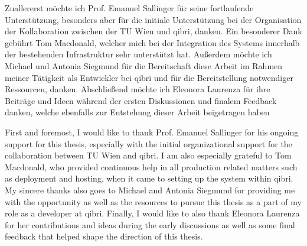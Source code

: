 \documentclass[draft,final]{vutinfth} %
\begin{document}
\frontmatter %

\addstatementpage

\begin{danksagung*}
Zuallererst möchte ich Prof. Emanuel Sallinger für seine fortlaufende Unterstützung, besonders aber für die initiale Unterstützung bei der Organisation der Kollaboration zwischen der TU Wien und qibri, danken. Ein besonderer Dank gebührt Tom Macdonald, welcher mich bei der Integration des Systems innerhalb der bestehenden Infrastruktur sehr unterstützt hat. Außerdem möchte ich Michael und Antonia Siegmund für die Bereitschaft diese Arbeit im Rahmen meiner Tätigkeit als Entwickler bei qibri und für die Bereitstellung notwendiger Ressourcen, danken. Abschließend möchte ich Eleonora Laurenza für ihre Beiträge und Ideen während der ersten Diskussionen und finalem Feedback danken, welche ebenfalls zur Entstehung dieser Arbeit beigetragen haben
\end{danksagung*}

\begin{acknowledgements*}
First and foremost, I would like to thank Prof. Emanuel Sallinger for his ongoing support for this thesis, especially with the initial organizational support for the collaboration between TU Wien and qibri. I am also especially grateful to Tom Macdonald, who provided continuous help in all production related matters such as deployment and hosting, when it came to setting up the system within qibri. My sincere thanks also goes to Michael and Antonia Siegmund for providing me with the opportunity as well as the resources to pursue this thesis as a part of my role as a developer at qibri. Finally, I would like to also thank Eleonora Laurenza for her contributions and ideas during the early discussions as well as some final feedback that helped shape the direction of this thesis.
\end{acknowledgements*}
\end{document}
